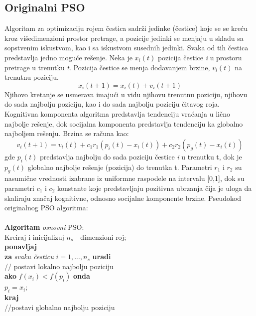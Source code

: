 \documentclass[a4paper]{article}
\begin{document}
\subsection{Originalni PSO}
Algoritam za optimizaciju rojem čestica sadrži jedinke (čestice) koje se se kreću kroz višedimenzioni prostor pretrage, a pozicije jedinki se menjaju u skladu sa sopstvenim iskustvom, kao i sa iskustvom susednih jedinki. Svaka od tih čestica predstavlja jedno moguće rešenje.
Neka je $x_i(t)$ pozicija čestice \textit{i} u prostoru pretrage u trenutku \textit{t}. Pozicija čestice se menja dodavanjem brzine, $v_i(t)$ na trenutnu poziciju. \[x_i(t+1) = x_i(t) + v_i(t+1) \]
Njihovo kretanje se usmerava imajući u vidu njihovu trenutnu poziciju, njihovu do sada najbolju poziciju, kao i do sada najbolju poziciju čitavog roja. Kognitivna komponenta algoritma predstavlja tendenciju vraćanja u lično najbolje rešenje, dok socijalna komponenta predstavlja tendenciju ka globalno najboljem rešenju. Brzina se računa kao: \[ v_i(t+1) = v_i(t) + c_1r_1(p_i(t) - x_i(t)) + c_2r_2(p_g(t) - x_i(t))\]
gde $p_i(t)$ predstavlja najbolju do sada poziciju čestice \textit{i} u trenutku t, dok je $p_g(t)$ globalno najbolje rešenje (pozicija) do trenutka t. Parametri $r_1$ i $r_2$ su nasumične vrednosti izabrane iz uniformne raspodele na intervalu [0,1], dok su parametri $c_1$ i $c_2$ konstante koje predstavljaju pozitivna ubrzanja čija je uloga da skaliraju značaj kognitivne, odnosno socijalne komponente brzine. 
Pseudokod originalnog PSO algoritma: \\ \\
\textbf{Algoritam} \textit{osnovni} PSO: \\ 
Kreiraj i inicijalizuj $n_s$ - dimenzioni roj;\\
\textbf{ponavljaj} \\ 
\hspace*{5mm}\textbf{za} \textit{svaku česticu} $\textit{i} = 1,...,n_s$ \textbf{uradi} \\
\hspace*{5mm} // postavi lokalno najbolju poziciju \\
\hspace*{10mm} \textbf{ako} $f(x_i) < f(p_i)$ \textbf{onda} \\
\hspace*{15mm} $p_i = x_i;$ \\
\hspace*{10mm} \textbf{kraj} \\
\hspace*{5mm}//postavi globalno najbolju poziciju \\\
\end{document}
